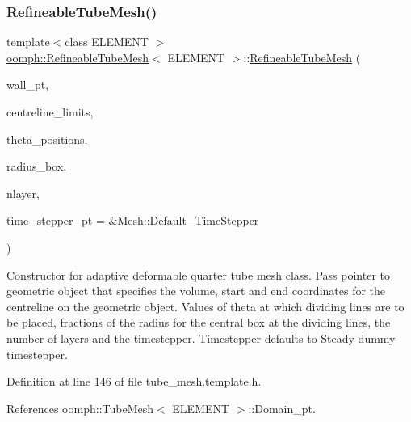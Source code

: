 \subsubsection{\texorpdfstring{Refineable\+Tube\+Mesh()}{RefineableTubeMesh()}}
{\footnotesize\ttfamily template$<$class E\+L\+E\+M\+E\+NT $>$ \\
\hyperlink{classoomph_1_1RefineableTubeMesh}{oomph\+::\+Refineable\+Tube\+Mesh}$<$ E\+L\+E\+M\+E\+NT $>$\+::\hyperlink{classoomph_1_1RefineableTubeMesh}{Refineable\+Tube\+Mesh} (\begin{DoxyParamCaption}\item[{Geom\+Object $\ast$}]{wall\+\_\+pt,  }\item[{const Vector$<$ double $>$ \&}]{centreline\+\_\+limits,  }\item[{const Vector$<$ double $>$ \&}]{theta\+\_\+positions,  }\item[{const Vector$<$ double $>$ \&}]{radius\+\_\+box,  }\item[{const unsigned \&}]{nlayer,  }\item[{Time\+Stepper $\ast$}]{time\+\_\+stepper\+\_\+pt = {\ttfamily \&Mesh\+:\+:Default\+\_\+TimeStepper} }\end{DoxyParamCaption})\hspace{0.3cm}{\ttfamily [inline]}}



Constructor for adaptive deformable quarter tube mesh class. Pass pointer to geometric object that specifies the volume, start and end coordinates for the centreline on the geometric object. Values of theta at which dividing lines are to be placed, fractions of the radius for the central box at the dividing lines, the number of layers and the timestepper. Timestepper defaults to Steady dummy timestepper. 



Definition at line 146 of file tube\+\_\+mesh.\+template.\+h.



References oomph\+::\+Tube\+Mesh$<$ E\+L\+E\+M\+E\+N\+T $>$\+::\+Domain\+\_\+pt.

\mbox{\label{classoomph_1_1RefineableTubeMesh_a743f3d17c3d5f0abe88ee1a7bda0b149}} 
